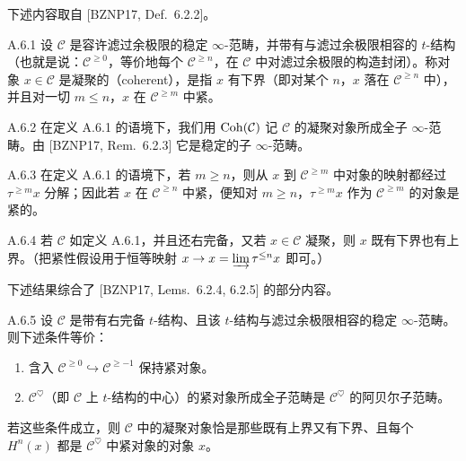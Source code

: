 下述内容取自 [BZNP17, Def.~6.2.2]。

\begin{defn}{A.6.1}\label{defn:a4-17-A-6-1}
设 $\mathcal C$ 是容许滤过余极限的稳定 $\infty$-范畴，并带有与滤过余极限相容的 $t$-结构（也就是说：$\mathcal C^{\geq0}$，等价地每个 $\mathcal C^{\geq n}$，在 $\mathcal C$ 中对滤过余极限的构造封闭）。称对象 $x\in\mathcal C$ 是凝聚的（coherent），是指 $x$ 有下界（即对某个 $n$，$x$ 落在 $\mathcal C^{\geq n}$ 中），并且对一切 $m\leq n$，$x$ 在 $\mathcal C^{\geq m}$ 中紧。
\end{defn}


\begin{defn}{A.6.2}\label{defn:a4-17-A-6-2}
在定义 A.6.1 的语境下，我们用 $\operatorname{Coh}(\mathcal C)$ 记 $\mathcal C$ 的凝聚对象所成全子 $\infty$-范畴。由 [BZNP17, Rem.~6.2.3] 它是稳定的子 $\infty$-范畴。
\end{defn}

\begin{rem}{A.6.3}\label{rem:a4-17-A-6-3}
在定义 A.6.1 的语境下，若 $m\geq n$，则从 $x$ 到 $\mathcal C^{\geq m}$ 中对象的映射都经过 $\tau^{\geq m}x$ 分解；因此若 $x$ 在 $\mathcal C^{\geq n}$ 中紧，便知对 $m\geq n$，$\tau^{\geq m}x$ 作为 $\mathcal C^{\geq m}$ 的对象是紧的。
\end{rem}

\begin{rem}{A.6.4}\label{rem:a4-17-A-6-4}
若 $\mathcal C$ 如定义 A.6.1，并且还右完备，又若 $x\in\mathcal C$ 凝聚，则 $x$ 既有下界也有上界。（把紧性假设用于恒等映射 $x\to x=\varinjlim\tau^{\leq n}x$ 即可。）
\end{rem}

下述结果综合了 [BZNP17, Lems.~6.2.4, 6.2.5] 的部分内容。

\begin{lem}{A.6.5}\label{lem:a4-17-A-6-5}
设 $\mathcal C$ 是带有右完备 $t$-结构、且该 $t$-结构与滤过余极限相容的稳定 $\infty$-范畴。则下述条件等价：
\begin{enumerate}[label=(\arabic*)]
\item 含入 $\mathcal C^{\geq0}\hookrightarrow\mathcal C^{\geq-1}$ 保持紧对象。
\item $\mathcal C^{\heartsuit}$（即 $\mathcal C$ 上 $t$-结构的中心）的紧对象所成全子范畴是 $\mathcal C^{\heartsuit}$ 的阿贝尔子范畴。
\end{enumerate}
若这些条件成立，则 $\mathcal C$ 中的凝聚对象恰是那些既有上界又有下界、且每个 $H^n(x)$ 都是 $\mathcal C^{\heartsuit}$ 中紧对象的对象 $x$。
\end{lem}

